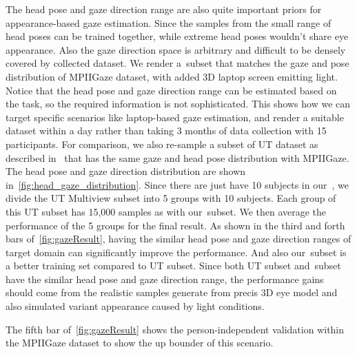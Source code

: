 The head pose and gaze direction range are also quite important priors for appearance-based gaze estimation. Since the samples from the small range of head poses can be trained together, while extreme head poses wouldn't share eye appearance. Also the gaze direction space is arbitrary and difficult to be densely covered by collected dataset. 
We render a~\dataset subset that matches the gaze and pose distribution of MPIIGaze dataset, with added 3D laptop screen emitting light. Notice that the head pose and gaze direction range can be estimated based on the task, so the required information is not sophisticated. This shows how we can target specific scenarios like laptop-based gaze estimation, and render a suitable dataset within a day rather than taking 3 months of data collection with 15 participants. 
For comparison, we also re-sample a subset of UT dataset as described in~\cite{zhang15_cvpr} that has the same gaze and head pose distribution with MPIIGaze. The head pose and gaze direction distribution are shown in~\autoref{fig:head_gaze_distribution}. Since there are just have 10 subjects in our~\dataset, we divide the UT Multiview subset into 5 groups with 10 subjects. Each group of this UT subset has 15,000 samples as with our~\dataset subset. We then average the performance of the 5 groups for the final result. 
As shown in the third and forth bars of~\autoref{fig:gazeResult}, having the similar head pose and gaze direction ranges of target domain can significantly improve the performance. And also our~\dataset subset is a better training set compared to UT subset. Since both UT subset and~\dataset subset have the similar head pose and gaze direction range, the performance gains should come from the realistic samples generate from precis 3D eye model and also simulated variant appearance caused by light conditions.

The fifth bar of~\autoref{fig:gazeResult} shows the person-independent validation within the MPIIGaze dataset to show the up bounder of this scenario.




